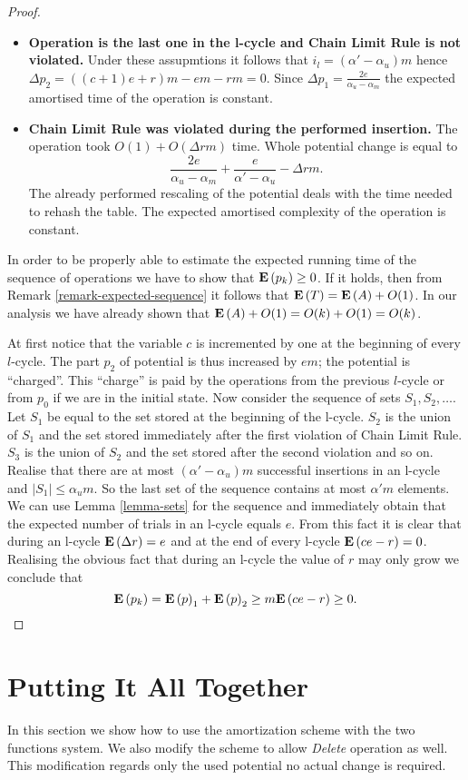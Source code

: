 \begin{proof}
\begin{itemize}
\item \textbf{Operation is the last one in the l-cycle and Chain Limit Rule is not violated.} Under these assupmtions it follows that $i_l = (\alpha' - \alpha_u)m$ hence $\Delta p_2 = ((c + 1)e + r)m - em - rm = 0$. Since $\Delta p_1 = \frac{2e}{\alpha_u - \alpha_m}$ the expected amortised time of the operation is constant.

\item \textbf{Chain Limit Rule was violated during the performed insertion.}
The operation took $O(1) + O(\Delta r m)$ time. Whole potential change is equal to \[ \frac{2e}{\alpha_u - \alpha_m} + \frac{e}{\alpha' - \alpha_u} - \Delta r m .\] The already performed rescaling of the potential deals with the time needed to rehash the table. The expected amortised complexity of the operation is constant.
\end{itemize}

In order to be properly able to estimate the expected running time of the sequence of operations we have to show that $\mathbf{E}\left(p_k\right) \geq 0$. If it holds, then from Remark \ref{remark-expected-sequence} it follows that $\mathbf{E}\left(T\right) = \mathbf{E}\left(A\right) + O(1)$. In our analysis we have already shown that $\mathbf{E}\left(A\right) + O(1) = O(k) + O(1) = O(k)$. 

At first notice that the variable $c$ is incremented by one at the beginning of every $l$-cycle. The part $p_2$ of potential is thus increased by $em$; the potential is ``charged''. This ``charge'' is paid by the operations from the previous $l$-cycle or from $p_0$ if we are in the initial state. Now consider the sequence of sets $S_1, S_2, \dots$. Let $S_1$ be equal to the set stored at the beginning of the l-cycle. $S_2$ is the union of $S_1$ and the set stored immediately after the first violation of Chain Limit Rule. $S_3$ is the union of $S_2$ and the set stored after the second violation and so on. Realise that there are at most $(\alpha' - \alpha_u)m$ successful insertions in an l-cycle and $|S_1| \leq \alpha_u m$. So the last set of the sequence contains at most $\alpha'm$ elements. We can use Lemma \ref{lemma-sets} for the sequence and immediately obtain that the expected number of trials in an l-cycle equals $e$. From this fact it is clear that during an l-cycle $\mathbf{E}\left(\Delta r\right) = e$ and at the end of every l-cycle $\mathbf{E}\left(ce - r\right) = 0$. Realising the obvious fact that during an l-cycle the value of $r$ may only grow we conclude that
\[
\mathbf{E}\left(p_k\right) = \mathbf{E}\left(p\right)_1 + \mathbf{E}\left(p\right)_2 \geq m\mathbf{E}\left(ce - r\right) \geq 0.
\]
\end{proof}

\section{Putting It All Together}
In this section we show how to use the amortization scheme with the two functions system. We also modify the scheme to allow \emph{Delete} operation as well. This modification regards only the used potential no actual change is required.


